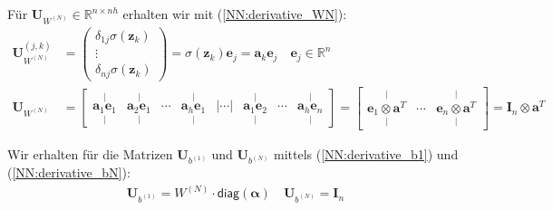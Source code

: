 \documentclass[a4paper, 12pt]{scrartcl}
\begin{document}
Für $\bm{U}_{W^{(N)}} \in \mathbb{R}^{n \times nh}$ erhalten wir mit (\ref{NN:derivative_WN}):
\begin{align*}
    \bm{U}_{W^{(N)}}^{(j,k)} 
    &=
    \begin{pmatrix}
        \delta_{1j} \sigma(\bm{z}_k) \\
        \vdots \\
        \delta_{nj} \sigma(\bm{z}_k)
    \end{pmatrix}
    =
    \sigma(\bm{z}_k) \bm{e}_j
    =
    \bm{a}_k \bm{e}_j 
    \quad
    \bm{e}_j \in \mathbb{R}^n 
    \\
    \bm{U}_{W^{(N)}}
    &=
    \begin{bmatrix}
        \overset{\vert}{\underset{\vert}{\bm{a}_1 \bm{e}_1}}
        &
        \overset{\vert}{\underset{\vert}{\bm{a}_2 \bm{e}_1}}
        &
        \cdots
        &
        \overset{\vert}{\underset{\vert}{\bm{a}_h \bm{e}_1}}
        &
        \bigg|
        \cdots 
        \bigg|
        &
        \overset{\vert}{\underset{\vert}{\bm{a}_1 \bm{e}_2}}
        &
        \cdots 
        &
        \overset{\vert}{\underset{\vert}{\bm{a}_h \bm{e}_n}}
    \end{bmatrix}
    =
    \begin{bmatrix}
        \overset{\vert}{\underset{\vert}{\bm{e}_1 \otimes \bm{a}^T}}
        &
        \cdots
        &
        \overset{\vert}{\underset{\vert}{\bm{e}_n \otimes \bm{a}^T}}
    \end{bmatrix}
    =
    \bm{I}_n \otimes \bm{a}^T 
\end{align*}

Wir erhalten für die Matrizen $\bm{U}_{b^{(1)}}$ und $\bm{U}_{b^{(N)}}$ mittels 
(\ref{NN:derivative_b1}) und (\ref{NN:derivative_bN}):
%
\begin{align*}
    \bm{U}_{b^{(1)}}
    =
    W^{(N)} \cdot \mathsf{diag}\left(\bm{\alpha}\right)
    \quad
    \bm{U}_{b^{(N)}}
    =
    \bm{I}_n
\end{align*}
\end{document}
